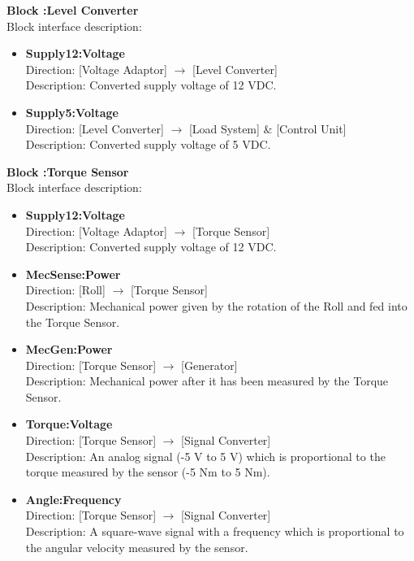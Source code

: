 \textbf{Block :Level Converter}\\
Block interface description:
\begin{itemize}
	\item \textbf{Supply12:Voltage}\\
	Direction: [Voltage Adaptor] $\rightarrow$ [Level Converter]\\
	Description: Converted supply voltage of 12 VDC.
	\item \textbf{Supply5:Voltage}\\
	Direction: [Level Converter] $\rightarrow$ [Load System] \& [Control Unit]\\
	Description: Converted supply voltage of 5 VDC.
\end{itemize}
			
\textbf{Block :Torque Sensor}\\
Block interface description:
\begin{itemize}
	\item \textbf{Supply12:Voltage}\\
	Direction: [Voltage Adaptor] $\rightarrow$ [Torque Sensor]\\
	Description: Converted supply voltage of 12 VDC.
	\item \textbf{MecSense:Power}\\
	Direction: [Roll] $\rightarrow$ [Torque Sensor]\\
	Description: Mechanical power given by the rotation of the Roll and fed into the Torque Sensor.
	\item \textbf{MecGen:Power}\\
	Direction: [Torque Sensor] $\rightarrow$ [Generator]\\
	Description: Mechanical power after it has been measured by the Torque Sensor.
	\item \textbf{Torque:Voltage}\\
	Direction: [Torque Sensor] $\rightarrow$ [Signal Converter]\\
	Description: An analog signal (-5 V to 5 V) which is proportional to the torque measured by the sensor (-5 Nm to 5 Nm).
	\item \textbf{Angle:Frequency}\\
	Direction: [Torque Sensor] $\rightarrow$ [Signal Converter]\\
	Description: A square-wave signal with a frequency which is proportional to the angular velocity measured by the sensor.
\end{itemize}
							
